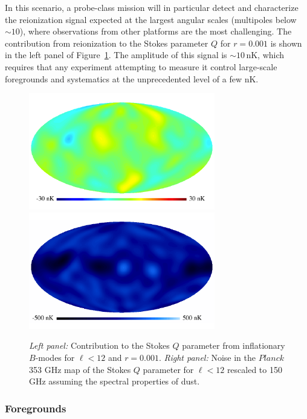 In this scenario, a probe-class mission will in particular detect and
characterize the reionization signal expected at the largest angular
scales (multipoles below $\sim\!10$), where observations from other
platforms are the most challenging. The contribution from reionization
to the Stokes parameter $Q$ for $r=0.001$ is shown in the left panel
of Figure~\ref{fig:Qrp001}. The amplitude of this signal is
$\sim\!10$\,nK, which requires that any experiment attempting to
measure it control large-scale foregrounds and systematics at the
unprecedented level of a few nK.

\begin{figure}[h]
\begin{center}
\includegraphics[width=3.2in]{Figures/P15_2_12_rp001.pdf}
\includegraphics[width=3.2in]{Figures/P353_N_2_12.pdf}
\end{center}
\caption{{\it Left panel:} Contribution to the Stokes $Q$ parameter
  from inflationary $B$-modes for $\ell<12$ and $r=0.001$. {\it Right
    panel:} Noise in the $Planck$ 353 GHz map of the Stokes $Q$
  parameter for $\ell<12$ rescaled to 150\,GHz assuming the spectral
  properties of dust.}
\label{fig:Qrp001}
\end{figure}

\subsubsection{Foregrounds}


